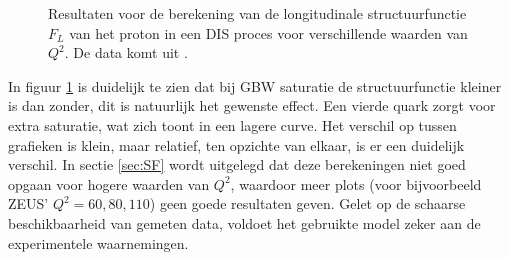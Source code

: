 \documentclass[a4paper,11pt]{article}
\numberwithin{equation}{section} %
\begin{document}
\begin{figure} [H]
\centering
{}
\caption{Resultaten voor de berekening van de longitudinale structuurfunctie $F_L$ van het proton in een DIS proces voor verschillende waarden van $Q^2$. De data komt uit \cite{ZEUS}.}
\label{fig:ResFL}
\end{figure}
In figuur \ref{fig:ResFL} is duidelijk te zien dat bij GBW saturatie de structuurfunctie kleiner is dan zonder, dit is natuurlijk het gewenste effect.
Een vierde quark zorgt voor extra saturatie, wat zich toont in een lagere curve.
Het verschil op tussen grafieken is klein, maar relatief, ten opzichte van elkaar, is er een duidelijk verschil.
In sectie \ref{sec:SF} wordt uitgelegd dat deze berekeningen niet goed opgaan voor hogere waarden van $Q^2$, waardoor meer plots (voor bijvoorbeeld ZEUS’ $Q^2=60, 80, 110$) geen goede resultaten geven.
Gelet op de schaarse beschikbaarheid van gemeten data, voldoet het gebruikte model zeker aan de experimentele waarnemingen.
\end{document}
